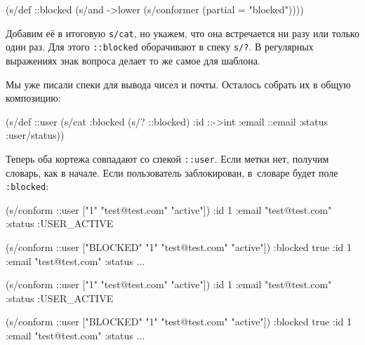 \begin{english}
  \begin{clojure}
(s/def ::blocked
  (s/and
   ->lower
   (s/conformer (partial = "blocked"))))
  \end{clojure}
\end{english}


Добавим её в итоговую \verb|s/cat|, но укажем, что она встречается ни разу
или только один раз. Для этого \verb|::blocked| оборачивают в спеку
\verb|s/?|.  В регулярных выражениях знак вопроса делает то же самое для
шаблона.

Мы уже писали спеки для вывода чисел и почты. Осталось собрать их в общую
композицию:

\begin{english}
  \begin{clojure}
(s/def ::user
  (s/cat :blocked (s/? ::blocked)
         :id ::->int
         :email ::email
         :status :user/status))
  \end{clojure}
\end{english}

Теперь оба кортежа совпадают со спекой \verb|::user|. Если метки нет, получим
словарь, как в начале. Если пользователь заблокирован, в~словаре будет поле
\verb|:blocked|:

\ifx\devicetype\mobile

\begin{english}
  \begin{clojure}
(s/conform ::user
  ["1" "test@test.com" "active"])
{:id 1
 :email "test@test.com"
 :status :USER_ACTIVE}

(s/conform ::user
  ["BLOCKED" "1"
   "test@test.com" "active"])
{:blocked true
 :id 1
 :email "test@test.com"
 :status ...}
  \end{clojure}
\end{english}

\else

\begin{english}
  \begin{clojure}
(s/conform ::user ["1" "test@test.com" "active"])
{:id 1 :email "test@test.com" :status :USER_ACTIVE}

(s/conform ::user ["BLOCKED" "1" "test@test.com" "active"])
{:blocked true :id 1 :email "test@test.com" :status ...}
  \end{clojure}
\end{english}

\fi

